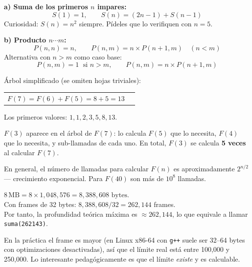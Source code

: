 \documentclass[12pt, oneside]{article}
\begin{document}
\begin{notaprofesor}
  \textbf{a) Suma de los primeros $n$ impares:}
  \[
    S(1) = 1, \qquad S(n) = (2n-1) + S(n-1)
  \]
  Curiosidad: $S(n) = n^2$ siempre.  Pídeles que lo verifiquen con $n=5$.

  \textbf{b) Producto $n \cdots m$:}
  \[
    P(n, n) = n, \qquad P(n, m) = n \times P(n+1, m) \quad (n < m)
  \]
  Alternativa con $n > m$ como caso base:
  \[
    P(n, m) = 1 \;\text{ si } n > m, \qquad P(n, m) = n \times P(n+1, m)
  \]
\end{notaprofesor}

\begin{notaprofesor}
  Árbol simplificado (se omiten hojas triviales):
  \begin{center}
  \begin{tabular}{ll}
    $F(7) = F(6) + F(5) = 8 + 5 = 13$ \\
  \end{tabular}
  \end{center}
  Los primeros valores: $1,1,2,3,5,8,13$.  \checkmark

  $F(3)$ aparece en el árbol de $F(7)$:
  lo calcula $F(5)$ que lo necesita, $F(4)$ que lo necesita,
  y sub-llamadas de cada uno.
  En total, $F(3)$ se calcula \textbf{5 veces} al calcular $F(7)$.

  En general, el número de llamadas para calcular $F(n)$ es
  aproximadamente $2^{n/2}$ — crecimiento exponencial.
  Para $F(40)$ son más de $10^8$ llamadas.
\end{notaprofesor}

\begin{notaprofesor}
  $8\,\text{MB} = 8 \times 1{,}048{,}576 = 8{,}388{,}608 \text{ bytes}$.\\
  Con frames de 32 bytes: $8{,}388{,}608 / 32 = 262{,}144$ frames.\\
  Por tanto, la profundidad teórica máxima es $\approx 262{,}144$, lo que
  equivale a llamar \texttt{suma(262143)}.

  En la práctica el frame es mayor (en Linux x86-64 con \texttt{g++} suele
  ser 32--64 bytes con optimizaciones desactivadas), así que el límite real
  está entre 100{,}000 y 250{,}000.  Lo interesante pedagógicamente es
  que el límite \textit{existe} y es calculable.
\end{notaprofesor}

\end{document}
